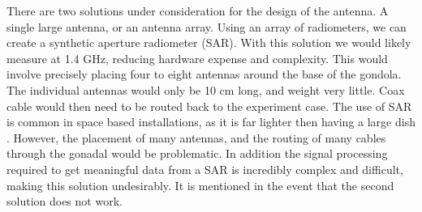 \documentclass[12pt]{article}
\begin{document}
There are two solutions under consideration for the design of the antenna. A single large antenna, or an antenna 
array. Using an array of radiometers, we can create a synthetic aperture radiometer (SAR). With this solution we
would likely measure at 1.4 GHz, reducing hardware expense and complexity. This would involve precisely placing
four to eight antennas around the base of the gondola. The individual antennas would only be 10 cm long, and
weight very little. Coax cable would then need to be routed back to the experiment case. The use of SAR is common
in space based installations, as it is far lighter then having a large dish \cite{skou1989microwave}. 
However, the placement of many antennas, and the routing of many cables through the gonadal would be 
problematic. In addition the signal processing required to get meaningful data from a SAR is incredibly complex
and difficult, making this solution undesirably. It is mentioned in the event that the second solution does 
not work.\\
\end{document}
